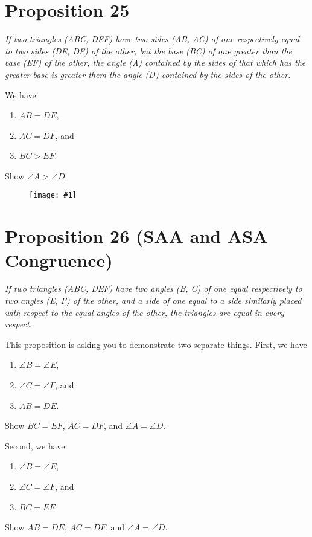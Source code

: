 \documentclass[openany]{book}
\newcommand{\diagram}[1]{
    \vspace*{\fill}
    \begin{figure}[H]
        \centering
        \texttt{[image: \#1]}
    \end{figure}
    \vspace*{\fill}
}
\newenvironment{proposition}
    {\begin{center}\em}
    {\end{center}}
\begin{document}
    \clearpage
    \section{Proposition 25}
    \begin{proposition}
    If two triangles (ABC, DEF) have two sides (AB, AC) of one respectively equal to two sides (DE, DF) of the other,
    but the base (BC) of one greater than the base (EF) of the other, the angle (A) contained by the sides of that
    which has the greater base is greater them the angle (D) contained by the sides of the other.
    \end{proposition}
    We have
    \begin{enumerate}
        \item $AB = DE$,
        \item $AC = DF$, and
        \item $BC > EF$.
    \end{enumerate}
        Show $\angle{A} > \angle{D}$.
    \diagram{prop25.pdf}


    \clearpage
    \section{Proposition 26 (SAA and ASA Congruence)}
    \begin{proposition}
    If two triangles (ABC, DEF) have two angles (B, C) of one equal respectively to two angles (E, F) of the other, and a side of one equal to a side similarly placed with respect to the equal angles of the other, the triangles are equal in every respect.
    \end{proposition}
    This proposition is asking you to demonstrate two separate things. First, we have
    \begin{enumerate}
        \item $\angle{B} = \angle{E}$,
        \item $\angle{C} = \angle{F}$, and
        \item $AB = DE$.
    \end{enumerate}
    Show $BC = EF$, $AC = DF$, and $\angle{A} = \angle{D}$.

    Second, we have
    \begin{enumerate}
        \item $\angle{B} = \angle{E}$,
        \item $\angle{C} = \angle{F}$, and
        \item $BC = EF$.
    \end{enumerate}
    Show $AB = DE$, $AC = DF$, and $\angle{A} = \angle{D}$.
\end{document}
